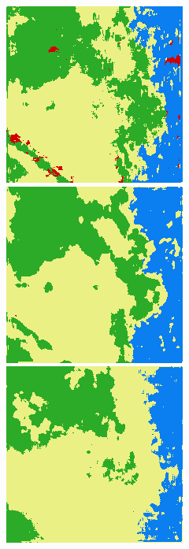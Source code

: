 \begin{figure}
    \includegraphics[width=\DensenetPredictionsImageWidth]{images/densenet/densenet-103/626312-prediction} \hfill
    \includegraphics[width=\DensenetPredictionsImageWidth]{images/densenet/densenet-67D/626312-prediction}
    \includegraphics[width=\DensenetPredictionsImageWidth]{images/densenet/densenet-56D/626312-prediction}


\end{figure}
